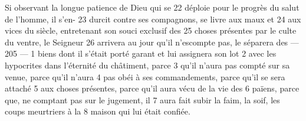Si observant la longue patience de Dieu qui se	 
22	 	déploie pour le progrès du salut de l'homme, il s'en-	 
23	 	durcit contre ses compagnons, se livre aux maux et	 
24	 	aux vices du siècle, entretenant son souci exclusif des	 
25	 	choses présentes par le culte du ventre, le Seigneur	 
26	 	arrivera au jour qu'il n'escompte pas, le séparera des	 
 	--- 205 ---	 
1	 	biens dont il s'était porté garant et lui assignera son lot	 
2	 	avec les hypocrites dans l'éternité du châtiment, parce	 
3	 	qu'il n'aura pas compté sur sa venue, parce qu'il n'aura	 
4	 	pas obéi à ses commandements, parce qu'il se sera attaché	 
5	 	aux choses présentes, parce qu'il aura vécu de la vie des	 
6	 	païens, parce que, ne comptant pas sur le jugement, il	 
7	 	aura fait subir la faim, la soif, les coups meurtriers à la	 
8	 	maison qui lui était confiée.